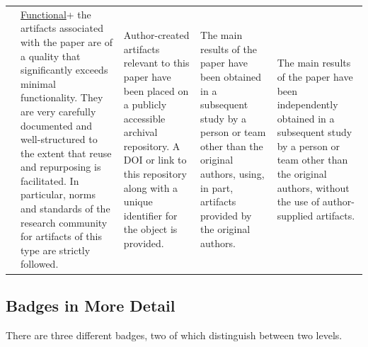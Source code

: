 \documentclass[twoside,a4paper]{refart}
\newcommand{\functional}{\protect\hyperlink{functional}{Functional}\xspace}
\begin{document}
\begin{tabularx}{0.9\paperwidth}{XXXXX}
  & \raggedright \functional +\newline
    the artifacts associated with the
    paper are of a quality that significantly exceeds minimal
    functionality. They are very carefully documented and
    well-structured to the extent that reuse and repurposing is
    facilitated. In particular, norms and standards of the research
    community for artifacts of this type are strictly followed.
  
    & \raggedright Author-created artifacts relevant to this paper
    have been placed on a publicly accessible archival repository. A
    DOI or link to this repository along with a unique identifier for
    the object is provided.
  
    & \raggedright Τhe main results of the paper have been obtained in
    a subsequent study by a person or team other than the original
    authors, using, in part, artifacts provided by the original
    authors.
    
    & \raggedright Τhe main results of the paper have been
    independently obtained in a subsequent study by a person or team
    other than the original authors, without the use of author-supplied
    artifacts.
\end{tabularx}

\newpage

\subsection{Badges in More Detail}

There are three different badges, two of which distinguish between two
levels.
\end{document}

